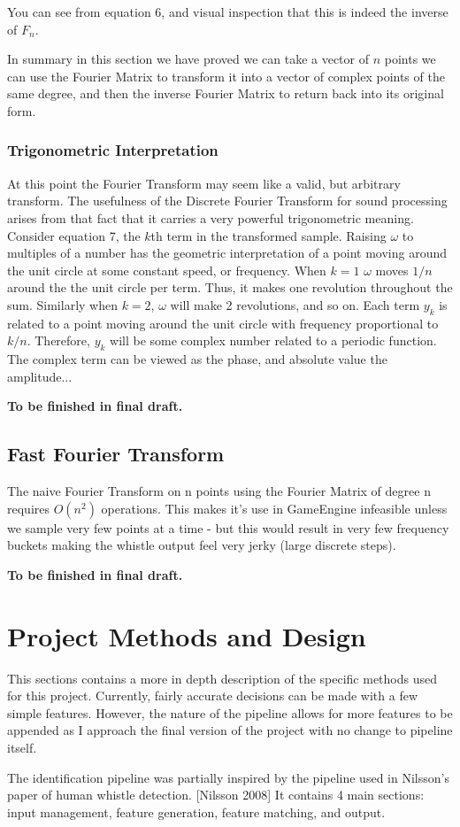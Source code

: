 \documentclass[DIV=calc, paper=a4, fontsize=11pt, twocolumn]{scrartcl}   %
\begin{document}
You can see from equation 6, and visual inspection that this is indeed the inverse of $F_{n}$.
\par In summary in this section we have proved we can take a vector of $n$ points we can use the Fourier Matrix to transform it into a vector of complex points of the same degree, and then the inverse Fourier Matrix to return back into its original form.
\subsubsection{Trigonometric Interpretation}

At this point the Fourier Transform may seem like a valid, but arbitrary transform. The usefulness of the Discrete Fourier Transform for sound processing arises from that fact that it carries a very powerful trigonometric meaning. Consider equation 7, the $k$th term in the transformed sample.
Raising $\omega$ to multiples of a number has the geometric interpretation of a point moving around the unit circle at some constant speed, or frequency. When $k = 1$ $\omega$ moves $1/n$ around the the unit circle per term. Thus, it makes one revolution throughout the sum. Similarly when $k=2$, $\omega$ will make 2 revolutions, and so on. Each term $y_k$ is related to a point moving around the unit circle with frequency proportional to $k/n$. Therefore, $y_k$ will be some complex number related to a periodic function. The complex term can be viewed as the phase, and absolute value the amplitude...

\par \textbf{To be finished in final draft.}


\subsection{Fast Fourier Transform}

The naive Fourier Transform on n points using the Fourier Matrix of degree n requires $O(n^2)$ operations. This makes it's use in GameEngine infeasible unless we sample very few points at a time - but this would result in very few frequency buckets making the whistle output feel very jerky (large discrete steps).

\par \textbf{To be finished in final draft.}


\section{Project Methods and Design}
   This sections contains a more in depth description of the specific methods used for this project. Currently, fairly accurate decisions can
   be made with a few simple features. However, the nature of the pipeline allows for more features to be appended as I approach the final version of the project with no change to pipeline itself.
   \par
   The identification pipeline was partially inspired by the pipeline used in Nilsson's paper of human whistle detection. [Nilsson 2008] It contains 4 main sections: input management, feature generation, feature matching, and output.
\end{document}
